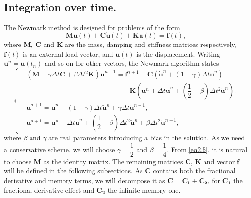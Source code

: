 \documentclass[12pt]{article}
\numberwithin{equation}{section}
\begin{document}
\subsection{Integration over time.}
The Newmark method \cite{krenk} is designed for problems of the form
\begin{equation}\label{prob_lineal}
\boldsymbol{M}\boldsymbol{\ddot{u}}(t) + \boldsymbol{C}\boldsymbol{\dot{u}}(t)+\boldsymbol{K}\boldsymbol{u}(t)=\boldsymbol{f}(t),
\end{equation}
where $\boldsymbol{M},\: \boldsymbol{C}$ and $\boldsymbol{K}$ are the mass, damping and stiffness matrices respectively, $\boldsymbol{f}(t)$ is an external load vector, and $\boldsymbol{u}(t)$ is the displacement. Writing $\boldsymbol{u}^n = \boldsymbol{u}(t_n)$ and so on for other vectors, the Newmark algorithm states
\begin{equation}\label{newmark}
\begin{cases}
&\left(\boldsymbol{M} + \gamma \Delta t \boldsymbol{C} + \beta\Delta t^2 \boldsymbol{K} \right)\boldsymbol{\ddot{u}}^{n+1} = \boldsymbol{f}^{n+1} - \boldsymbol{C}\left(\boldsymbol{\dot{u}}^n + (1-\gamma)\Delta t \boldsymbol{\ddot{u}}^n \right) \\ & \qquad \qquad \qquad \qquad \qquad \qquad \qquad  - \boldsymbol{K}\left(\boldsymbol{u}^n + \Delta t \boldsymbol{\dot{u}}^n + \left(\dfrac12 - \beta\right)\Delta t^2 \boldsymbol{\ddot{u}}^n \right), \\
&\boldsymbol{\dot{u}}^{n+1} = \boldsymbol{\dot{u}}^n + (1-\gamma)\Delta t  \boldsymbol{\ddot{u}}^n + \gamma \Delta t \boldsymbol{\ddot{u}}^{n+1}, \\
&\boldsymbol{u}^{n+1} = \boldsymbol{u}^n+\Delta t \boldsymbol{\dot{u}}^n+ \left(\dfrac12 - \beta\right)\Delta t^2 \boldsymbol{\ddot{u}}^n + \beta\Delta t^2 \boldsymbol{\ddot{u}}^{n+1},
\end{cases}
\end{equation}
where $\beta$ and $\gamma$ are real parameters introducing a bias in the solution. As we need a conservative scheme, we will choose $\gamma = \dfrac12$ and $\beta = \dfrac14$. From \eqref{eq2.5}, it is natural to choose $\boldsymbol{M}$ as the identity matrix. The remaining matrices $\boldsymbol{C}$, $\boldsymbol{K}$ and vector $\boldsymbol{f}$ will be defined in the following subsections. As $\boldsymbol{C}$ contains both the fractional derivative and memory terms, we will decompose it as $\boldsymbol{C} = \boldsymbol{C_1} + \boldsymbol{C_2}$, for $\boldsymbol{C_1}$ the fractional derivative effect and $\boldsymbol{C_2}$ the infinite memory one.
\end{document}
